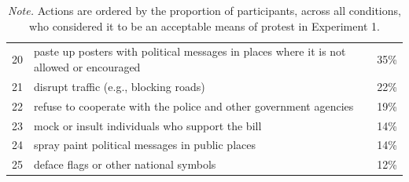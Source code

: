 \documentclass[twocolumn, 11pt, letterpaper]{article}
\begin{document}
\begin{table}
\begin{tabularx}{\linewidth}{rXr}
20 & paste up posters with political messages in places where it is not allowed or encouraged & 35\%\\
21 & disrupt traffic (e.g., blocking roads) & 22\%\\
22 & refuse to cooperate with the police and other government agencies & 19\%\\
23 & mock or insult individuals who support the bill & 14\%\\
24 & spray paint political messages in public places & 14\%\\
25 & deface flags or other national symbols & 12\%\\
\bottomrule
\end{tabularx}
\caption*{\textit{Note.} Actions are ordered by the proportion of participants, across all conditions, who considered it to be an acceptable means of protest in Experiment 1.}

\end{table}

\setcounter{table}{0}
\renewcommand{\thetable}{B\arabic{table}}
\end{document}
